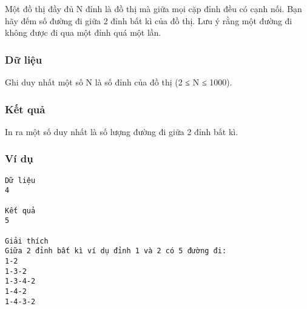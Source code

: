 

Một đồ thị đầy đủ N đỉnh là đồ thị mà giữa mọi cặp đỉnh đều có cạnh nối. Bạn hãy đếm số đường đi giữa 2 đỉnh bất kì của đồ thị. Lưu ý rằng một đường đi không được đi qua một đỉnh quá một lần.

\subsubsection{Dữ liệu}

Ghi duy nhất một số N là số đỉnh của đồ thị (2 ≤ N ≤ 1000).

\subsubsection{Kết quả}

In ra một số duy nhất là số lượng đường đi giữa 2 đỉnh bất kì.

\subsubsection{Ví dụ}
\begin{verbatim}
Dữ liệu
4

Kết quả
5

Giải thích
Giữa 2 đỉnh bất kì ví dụ đỉnh 1 và 2 có 5 đường đi:
1-2
1-3-2
1-3-4-2
1-4-2
1-4-3-2
\end{verbatim}